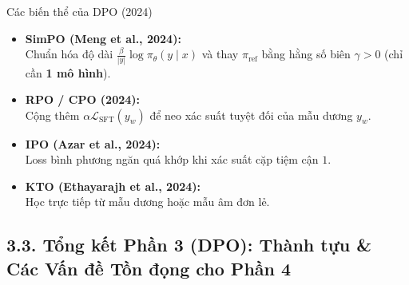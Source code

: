 \begin{frame}{Các biến thể của DPO (2024)}
      \small
      \begin{itemize}\setlength{\itemsep}{4pt}
        \item \textbf{SimPO (Meng et al., 2024):}\\
          Chuẩn hóa độ dài $\frac{\beta}{|y|}\log \pi_\theta(y \mid x)$ và thay $\pi_{\text{ref}}$ bằng hằng số biên $\gamma > 0$ (chỉ cần \textbf{1 mô hình}).
        \item \textbf{RPO / CPO (2024):}\\
          Cộng thêm $\alpha \mathcal{L}_{\text{SFT}}(y_w)$ để neo xác suất tuyệt đối của mẫu dương $y_w$.
        \item \textbf{IPO (Azar et al., 2024):}\\
          Loss bình phương ngăn quá khớp khi xác suất cặp tiệm cận $1$.
        \item \textbf{KTO (Ethayarajh et al., 2024):}\\
          Học trực tiếp từ mẫu dương hoặc mẫu âm đơn lẻ.
      \end{itemize}
  \par\vspace{0pt}
\end{frame}

\subsection{3.3. Tổng kết Phần 3 (DPO): Thành tựu \& Các Vấn đề Tồn đọng cho Phần 4}

